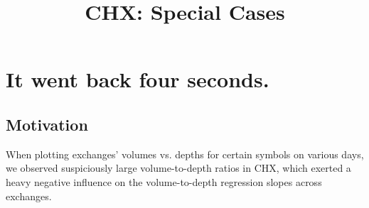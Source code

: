 \documentclass{article}
\begin{document}
\title{CHX: Special Cases}

\maketitle
\vspace{.5pc}

\section{It went back four seconds.}
\subsection{Motivation}
When plotting exchanges' volumes vs. depths for certain symbols on various days, we observed suspiciously large volume-to-depth ratios in CHX, which exerted a heavy negative influence on the volume-to-depth regression slopes across exchanges.\\
\end{document}
